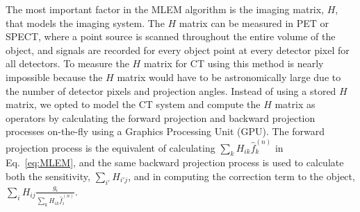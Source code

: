 The most important factor in the MLEM algorithm is the imaging matrix, $H$, that models the imaging system.  The $H$ matrix can be measured in PET or SPECT, where a point source is scanned throughout the entire volume of the object, and signals are recorded for every object point at every detector pixel for all detectors.  To measure the $H$ matrix for CT using this method is nearly impossible because the $H$ matrix would have to be astronomically large due to the number of detector pixels and projection angles.  Instead of using a stored $H$ matrix, we opted to model the CT system and compute the $H$ matrix as operators by calculating the forward projection and backward projection processes on-the-fly using a Graphics Processing Unit (GPU).  The forward projection process is the equivalent of calculating $\sum\limits_k H_{ik} \hat{f}_k^{(n)}$ in Eq.~\ref{eq:MLEM}, and the same backward projection process is used to calculate both the sensitivity, $\sum\limits_{i'} H_{i'j}$, and in computing the correction term to the object, $\sum\limits_i H_{ij} \frac{g_i}{\sum\limits_k H_{ik} \hat{f}_{i}^{(n)}}$.

